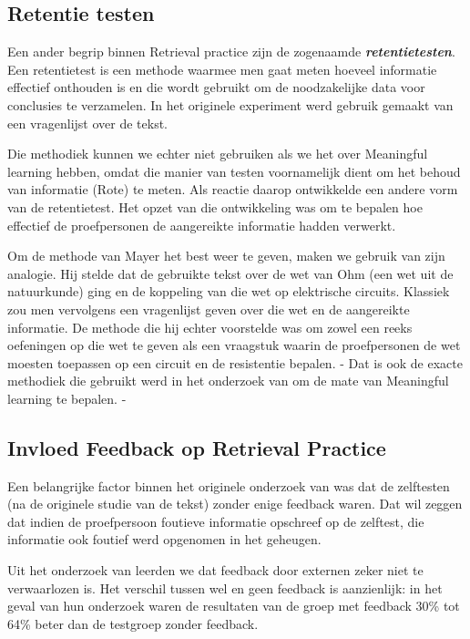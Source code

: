 \documentclass{hogent-article}
\newcommand{\boldit}[1]{\emph{\textbf{#1}}}
\begin{document}
\subsection{Retentie testen}
\label{RT}
Een ander begrip binnen Retrieval practice zijn de zogenaamde \boldit{retentietesten}. Een retentietest is een methode waarmee men gaat meten hoeveel informatie effectief onthouden is en die wordt gebruikt om de noodzakelijke data voor conclusies te verzamelen. In het originele experiment \textcite{Roediger_2006} werd gebruik gemaakt van een vragenlijst over de tekst.\\

\par
\noindent
Die methodiek kunnen we echter niet gebruiken als we het over Meaningful learning hebben, omdat die manier van testen voornamelijk dient om het behoud van informatie (Rote) te meten. Als reactie daarop ontwikkelde \textcite{Mayer_2002} een andere vorm van de retentietest. Het opzet van die ontwikkeling was om te bepalen hoe effectief de proefpersonen de aangereikte informatie hadden verwerkt.\\
\par
\noindent
Om de methode van Mayer het best weer te geven, maken we gebruik van zijn analogie. Hij stelde dat de gebruikte tekst over de wet van Ohm (een wet uit de natuurkunde) ging en de koppeling van die wet op elektrische circuits. Klassiek zou men vervolgens een vragenlijst geven over die wet en de aangereikte informatie. De methode die hij echter voorstelde was om zowel een reeks oefeningen op die wet te geven als een vraagstuk waarin de proefpersonen de wet moesten toepassen op een circuit en de resistentie bepalen. - Dat is ook de exacte methodiek die gebruikt werd in het onderzoek van \textcite{van_Gog_2012} om de mate van Meaningful learning te bepalen. -

\subsection{Invloed Feedback op Retrieval Practice}

Een belangrijke factor binnen het originele onderzoek van \textcite{Roediger_2006} was dat de zelftesten (na de originele studie van de tekst) zonder enige feedback waren. Dat wil zeggen dat indien de proefpersoon foutieve informatie opschreef op de zelftest, die informatie ook foutief werd opgenomen in het geheugen.\\
\par
\noindent
Uit het onderzoek van \textcite{Roediger_2011} leerden we dat feedback door externen zeker niet te verwaarlozen is. Het verschil tussen wel en geen feedback is aanzienlijk: in het geval van hun onderzoek waren de resultaten van de groep met feedback 30\% tot 64\% beter dan de testgroep zonder feedback.
\end{document}
